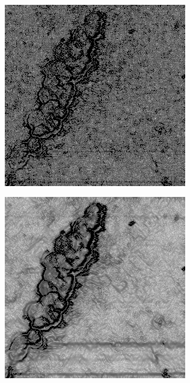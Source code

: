 \documentclass[../main.tex]{subfiles}
\begin{document}
\begin{figure}[!ht]
\begin{subfigure}{0.3\linewidth}
	\end{subfigure}\\[20pt]
	\begin{subfigure}{0.3\linewidth}
		\centering
		\includegraphics[keepaspectratio, width=\linewidth]{images/orig_grad.png}
	\end{subfigure}
	\hfill
	\begin{subfigure}{0.3\linewidth}
		\centering
		\includegraphics[keepaspectratio, width=\linewidth]{images/nlm_grad.png}

\end{subfigure}
\end{figure}
\end{document}
